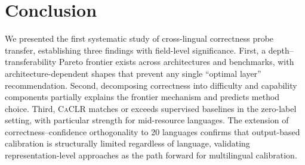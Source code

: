 \documentclass[11pt,a4paper]{article}
\newcommand{\caclr}{\textsc{CaCLR}}
\begin{document}
\section{Conclusion}

We presented the first systematic study of cross-lingual correctness probe transfer, establishing three findings with field-level significance.
First, a depth--transferability Pareto frontier exists across architectures and benchmarks, with architecture-dependent shapes that prevent any single ``optimal layer'' recommendation.
Second, decomposing correctness into difficulty and capability components partially explains the frontier mechanism and predicts method choice.
Third, \caclr{} matches or exceeds supervised baselines in the zero-label setting, with particular strength for mid-resource languages.
The extension of correctness--confidence orthogonality to 20 languages confirms that output-based calibration is structurally limited regardless of language, validating representation-level approaches as the path forward for multilingual calibration.
\end{document}
